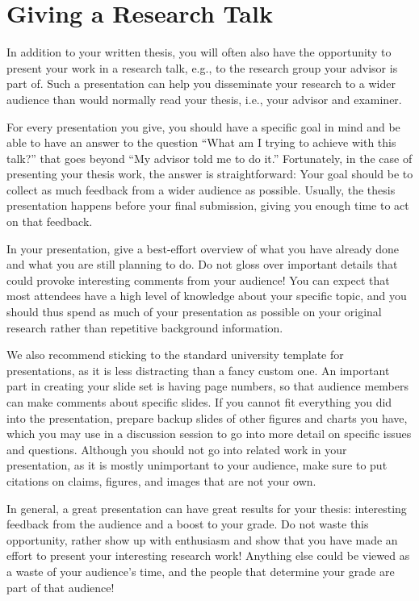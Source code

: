 \documentclass[a4paper]{article}
\begin{document}
\section{Giving a Research Talk}
\label{sec:talk}

In addition to your written thesis, you will often also have the opportunity to present your work in a research talk, e.g., to the research group your advisor is part of.
Such a presentation can help you disseminate your research to a wider audience than would normally read your thesis, i.e., your advisor and examiner.

For every presentation you give, you should have a specific goal in mind and be able to have an answer to the question ``What am I trying to achieve with this talk?'' that goes beyond ``My advisor told me to do it.''
Fortunately, in the case of presenting your thesis work, the answer is straightforward:
Your goal should be to collect as much feedback from a wider audience as possible.
Usually, the thesis presentation happens before your final submission, giving you enough time to act on that feedback.

In your presentation, give a best-effort overview of what you have already done and what you are still planning to do.
Do not gloss over important details that could provoke interesting comments from your audience!
You can expect that most attendees have a high level of knowledge about your specific topic, and you should thus spend as much of your presentation as possible on your original research rather than repetitive background information.

We also recommend sticking to the standard university template for presentations, as it is less distracting than a fancy custom one.
An important part in creating your slide set is having page numbers, so that audience members can make comments about specific slides.
If you cannot fit everything you did into the presentation, prepare backup slides of other figures and charts you have, which you may use in a discussion session to go into more detail on specific issues and questions.
Although you should not go into related work in your presentation, as it is mostly unimportant to your audience, make sure to put citations on claims, figures, and images that are not your own.

In general, a great presentation can have great results for your thesis: interesting feedback from the audience and a boost to your grade.
Do not waste this opportunity, rather show up with enthusiasm and show that you have made an effort to present your interesting research work!
Anything else could be viewed as a waste of your audience's time, and the people that determine your grade are part of that audience!
\end{document}
